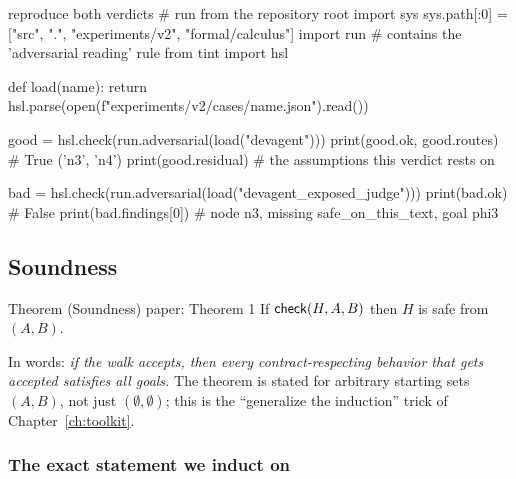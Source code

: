 \begin{tryit}{reproduce both verdicts}
# run from the repository root
import sys
sys.path[:0] = ["src", ".", "experiments/v2", "formal/calculus"]
import run                      # contains the 'adversarial reading' rule
from tint import hsl

def load(name):
    return hsl.parse(open(f"experiments/v2/cases/{name}.json").read())

good = hsl.check(run.adversarial(load("devagent")))
print(good.ok, good.routes)      # True ('n3', 'n4')
print(good.residual)             # the assumptions this verdict rests on

bad = hsl.check(run.adversarial(load("devagent_exposed_judge")))
print(bad.ok)                    # False
print(bad.findings[0])           # node n3, missing safe_on_this_text, goal phi3
\end{tryit}


\subsection{Soundness}
\label{sec:sound}

\begin{statement}{Theorem (Soundness) \hfill\normalfont paper: Theorem 1}
If $\mathsf{check}(H,A,B)$ then $H$ is safe from $(A,B)$.
\end{statement}

In words: \emph{if the walk accepts, then every contract-respecting behavior that gets accepted satisfies all goals.} The theorem is stated for arbitrary starting sets $(A,B)$, not just $(\emptyset,\emptyset)$; this is the ``generalize the induction'' trick of Chapter~\ref{ch:toolkit}.

\subsubsection*{The exact statement we induct on}

